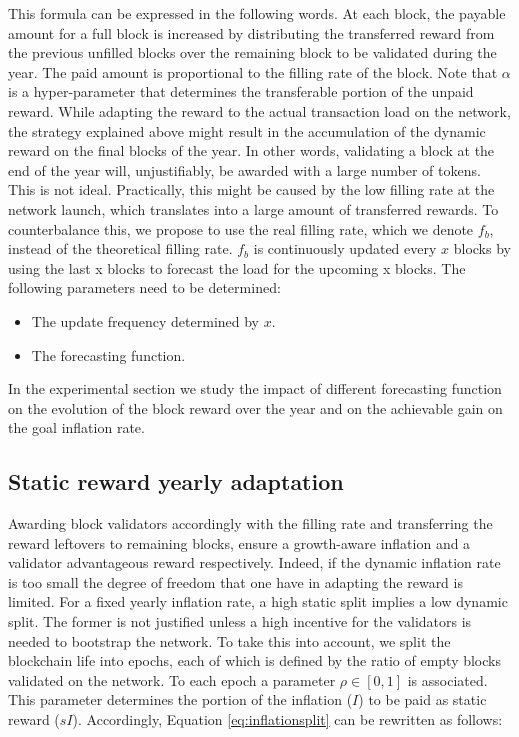 \documentclass[conference]{IEEEtran}
\begin{document}
This formula can be expressed in the following words. At each block, the payable amount for a full block is increased by distributing the transferred reward from the previous unfilled blocks over the remaining block to be validated during the year. The paid amount is proportional to the filling rate of the block. Note that $\alpha$ is a hyper-parameter that determines the transferable portion of the unpaid reward. While adapting the reward to the actual transaction load on the network, the strategy explained above might result in the accumulation of the dynamic reward on the final blocks of the year. In other words, validating a block at the end of the year will, unjustifiably, be awarded with a large number of tokens. This is not ideal. Practically, this might be caused by the low filling rate at the network launch, which translates into a large amount of transferred rewards. To counterbalance this, we propose to use the real filling rate, which we denote $f_b$, instead of the theoretical filling rate. $f_b$ is continuously updated every $x$ blocks by using the last x blocks to forecast the load for the upcoming x blocks. The following parameters need to be determined:
					
\begin{itemize}
	\item The update frequency determined by $x$.
	\item The forecasting function. 
\end{itemize}

In the experimental section we study the impact of different forecasting function on the evolution of the block reward over the year and on the achievable gain on the goal inflation rate.  

\subsection{Static reward yearly adaptation}
Awarding block validators accordingly with the filling rate and transferring the reward leftovers to remaining blocks, ensure a growth-aware inflation and a validator advantageous reward respectively. Indeed, if the dynamic inflation rate is too small the degree of freedom that one have in adapting the reward is limited. For a fixed yearly inflation rate, a high static split implies a low dynamic split. The former is not justified unless a high incentive for the validators is needed to bootstrap the network. To take this into account, we split the blockchain life into epochs, each of which is defined by the ratio of empty blocks validated on the network. To each epoch a parameter $\rho \in [0, 1]$ is associated. This parameter determines the portion of the inflation ($I$) to be paid as static reward ($sI$). Accordingly, Equation \ref{eq:inflationsplit} can be rewritten as follows:
\end{document}
